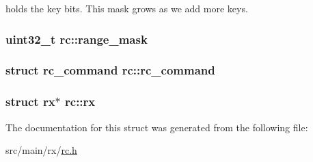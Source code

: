 holds the key bits. This mask grows as we add more keys. 

\hypertarget{structrc_a313a29909162376cedd0bf1b59e623df}{
\subsubsection[{range\+\_\+mask}]{\setlength{\rightskip}{0pt plus 5cm}uint32\+\_\+t rc\+::range\+\_\+mask}}\label{structrc_a313a29909162376cedd0bf1b59e623df}
\hypertarget{structrc_a4b0d090708f7ecc11b7b626a799a17aa}{
\subsubsection[{rc\+\_\+command}]{\setlength{\rightskip}{0pt plus 5cm}struct {\bf rc\+\_\+command} rc\+::rc\+\_\+command}}\label{structrc_a4b0d090708f7ecc11b7b626a799a17aa}
\hypertarget{structrc_adc90118df1a6cf987c36268c9fa4eb75}{
\subsubsection[{rx}]{\setlength{\rightskip}{0pt plus 5cm}struct {\bf rx}$\ast$ rc\+::rx}}\label{structrc_adc90118df1a6cf987c36268c9fa4eb75}


The documentation for this struct was generated from the following file\+:\begin{DoxyCompactItemize}
\item 
src/main/rx/\hyperlink{rc_8h}{rc.\+h}\end{DoxyCompactItemize}
